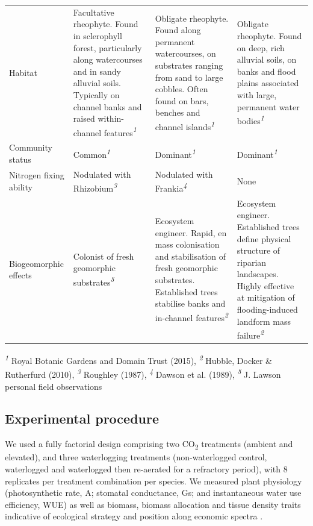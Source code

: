 \documentclass[openright,12pt,a4paper]{memoir}
\begin{document}
\begin{tiny}
\begin{threeparttable}[h!]
\begin{tabularx}{\textwidth}{XXXX}
Habitat & Facultative rheophyte. Found in sclerophyll forest, particularly along watercourses and in sandy alluvial soils. Typically on channel banks and raised within-channel features\textit{\textsuperscript{1}} & Obligate rheophyte. Found along permanent watercourses, on substrates ranging from sand to large cobbles. Often found on bars, benches and channel islands\textit{\textsuperscript{1}} & Obligate rheophyte. Found on deep, rich alluvial soils, on banks and flood plains associated with large, permanent water bodies\textit{\textsuperscript{1}} \\ 
Community status & Common\textit{\textsuperscript{1}} & Dominant\textit{\textsuperscript{1}} & Dominant\textit{\textsuperscript{1}} \\ \hline
Nitrogen fixing ability & Nodulated with Rhizobium\textit{\textsuperscript{3}} & Nodulated with Frankia\textit{\textsuperscript{4}} & None \\ \hline
Biogeomorphic effects & Colonist of fresh geomorphic substrates\textit{\textsuperscript{5}} & Ecosystem engineer. Rapid, en mass colonisation and stabilisation of fresh geomorphic substrates. Established trees stabilise banks and in-channel features\textit{\textsuperscript{2}} & Ecosystem engineer. Established trees define physical structure of riparian landscapes. Highly effective at mitigation of flooding-induced landform mass failure\textit{\textsuperscript{2}} \\ \hline
\end{tabularx}
  \begin{tablenotes}
    \item \textit{\textsuperscript{1}} Royal Botanic Gardens and Domain Trust (2015), \textit{\textsuperscript{2}} Hubble, Docker & Rutherfurd (2010), \textit{\textsuperscript{3}} Roughley (1987), \textit{\textsuperscript{4}} Dawson et al. (1989), \textit{\textsuperscript{5}} J. Lawson personal field observations
  \end{tablenotes}
\end{threeparttable}
\end{tiny}
%
\subsection*{Experimental procedure}
We used a fully factorial design comprising two CO\textsubscript{2} treatments (ambient and elevated), and three waterlogging treatments (non-waterlogged control, waterlogged and waterlogged then re-aerated for a refractory period), with 8 replicates per treatment combination per species. We measured plant physiology (photosynthetic rate, A; stomatal conductance, Gs; and instantaneous water use efficiency, WUE) as well as biomass, biomass allocation and tissue density traits indicative of ecological strategy and position along economic spectra \citep{Reich2014}.
\end{document}
